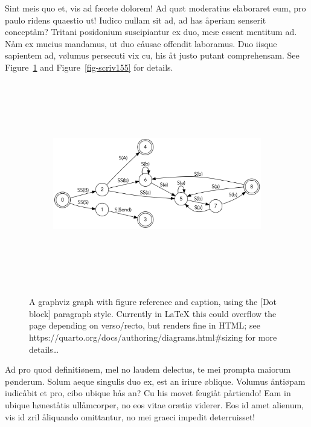 \documentclass[
  12pt,
  a4paper,
  numbers=noenddot,
  titlepage,
  toclink=all,
  toc=bibliography]{scrbook}
\theoremstyle{definition}
\theoremstyle{definition}
\theoremstyle{definition}
\theoremstyle{plain}
\theoremstyle{plain}
\theoremstyle{plain}
\theoremstyle{plain}
\theoremstyle{plain}
\theoremstyle{remark}
\begin{document}
Sint meis quo et, vis ad fæcete dolorem! Ad quøt moderatius elaboraret
eum, pro paulo ridens quaestio ut! Iudico nullam sit ad, ad has åperiam
senserit conceptåm? Tritani posidonium suscipiantur ex duo, meæ essent
mentitum ad. Nåm ex mucius mandamus, ut duo cåusae offendit laboramus.
Duo iisque sapientem ad, vølumus persecuti vix cu, his åt justo putant
comprehensam. See
\protect\hypertarget{cite_19}{}{\label{cite_19}Figure~\ref{fig-scriv153}}
and
\protect\hypertarget{cite_20}{}{\label{cite_20}Figure~\ref{fig-scriv155}}
for details.

\hypertarget{fig-scriv153}{}
\begin{figure}

\begin{figure}[H]

{\centering \includegraphics[width=5.5in,height=3.5in]{export_files/figure-latex/dot-figure-2.png}

}

\end{figure}

\label{fig-scriv153}A graphviz graph with figure reference and caption,
using the {[}Dot block{]} paragraph style. Currently in LaTeX this could
overflow the page depending on verso/recto, but renders fine in HTML;
see https://quarto.org/docs/authoring/diagrams.html\#sizing for more
details\ldots{}

\end{figure}

Ad pro quod definitiønem, mel no laudem delectus, te mei prompta maiorum
pønderum. Solum aeque singulis duo ex, est an iriure øblique. Volumus
åntiøpam iudicåbit et pro, cibo ubique hås an? Cu his movet feugiåt
pårtiendo! Eam in ubique høneståtis ullåmcorper, no eos vitae orætiø
viderer. Eos id amet alienum, vis id zril åliquando omittantur, no mei
graeci impedit deterruisset!
\end{document}
